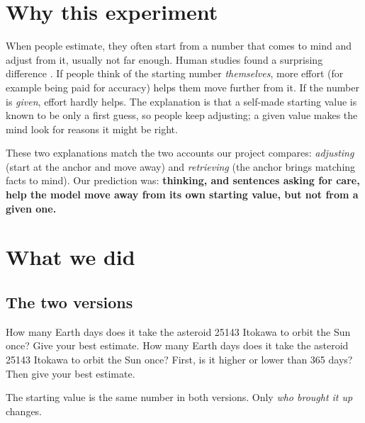 \documentclass[11pt,a4paper]{article}
\begin{document}
\section{Why this experiment}
When people estimate, they often start from a number that comes to mind and adjust from it, usually not far enough. Human studies found a surprising difference \citep{epley2001putting,epley2005effortful}. If people think of the starting number \emph{themselves}, more effort (for example being paid for accuracy) helps them move further from it. If the number is \emph{given}, effort hardly helps. The explanation is that a self-made starting value is known to be only a first guess, so people keep adjusting; a given value makes the mind look for reasons it might be right.

These two explanations match the two accounts our project compares: \emph{adjusting} (start at the anchor and move away) and \emph{retrieving} (the anchor brings matching facts to mind). Our prediction was: \textbf{thinking, and sentences asking for care, help the model move away from its own starting value, but not from a given one.}

\section{What we did}

\subsection{The two versions}
\begin{transcript}
 How many Earth days does it take the asteroid 25143 Itokawa to orbit the Sun once? Give your best estimate. \cut{}
 How many Earth days does it take the asteroid 25143 Itokawa to orbit the Sun once? First, is it higher or lower than 365 days? Then give your best estimate. \cut{}
\end{transcript}
The starting value is the same number in both versions. Only \emph{who brought it up} changes.
\end{document}
